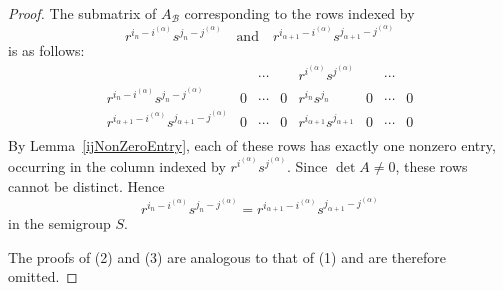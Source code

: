 \documentclass[11pt,reqno]{amsart}
\theoremstyle{plain}
\theoremstyle{remark}
\theoremstyle{definition}
\begin{document}
\begin{proof}
The submatrix of $A_{\mathcal B}$ corresponding to the rows indexed by
\[
r^{i_n-i^{(\alpha)}}s^{j_n-j^{(\alpha)}}
\quad\text{and}\quad
r^{i_{\alpha+1}-i^{(\alpha)}}s^{j_{\alpha+1}-j^{(\alpha)}}
\]
is as follows:
\[
\begin{array}{c|cccccccc}
 &~ & \cdots &~& r^{i^{(\alpha)}}s^{j^{(\alpha)}} &~& \cdots &~ \\ \hline
r^{i_{n}-i^{(\alpha)}}s^{j_n-j^{(\alpha)}} & 0 & \cdots & 0 & r^{i_n}s^{j_n} & 0 & \cdots & 0 \\
r^{i_{\alpha+1}-i^{(\alpha)}}s^{j_{\alpha+1}-j^{(\alpha)}} & 0 & \cdots & 0 & r^{i_{\alpha+1}}s^{j_{\alpha+1}} & 0 & \cdots & 0 \\
\end{array}
\]
By Lemma~\ref{ijNonZeroEntry}, each of these rows has exactly one nonzero entry, occurring in the column indexed by $r^{i^{(\alpha)}}s^{j^{(\alpha)}}$. Since $\det A\neq0$, these rows cannot be distinct. Hence
\[
r^{i_n-i^{(\alpha)}}s^{j_n-j^{(\alpha)}}=r^{i_{\alpha+1}-i^{(\alpha)}}s^{j_{\alpha+1}-j^{(\alpha)}}
\]
in the semigroup $S$.

%

The proofs of {\rm(2)} and {\rm(3)} are analogous to that of {\rm(1)} and are therefore omitted.
\end{proof}
\end{document}

